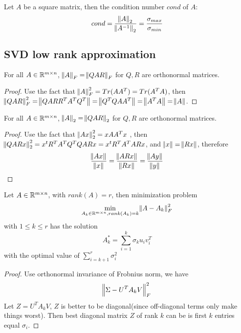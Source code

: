 \begin{refsection}
\begin{lemma}
Let $A$ be a square matrix, then the condition number $cond$ of $A$:
$$cond = \frac{\norm{A}_2}{\norm{A^{-1}}_2} = \frac{\sigma_{max}}{\sigma_{min}}$$
\end{lemma}



\subsection{SVD low rank approximation}
\begin{lemma}
For all $A\in \mathbb{R}^{m\times n}$, $\norm{A}_F = \norm{QAR}_F$ for $Q,R$ are orthonormal matrices. 
\end{lemma}

\begin{proof}
Use the fact that $\norm{A}_F^2 = Tr(AA^T) = Tr(A^TA)$, then $\norm{QAR}_F^2 = \norm{QARR^TA^TQ^T} = \norm{Q^TQAA^T} = \norm{A^TA} = \norm{A}$.
\end{proof}


\begin{lemma}
For all $A\in \mathbb{R}^{m\times n}$, $\norm{A}_2 = \norm{QAR}_2$ for $Q,R$ are orthonormal matrices. 
\end{lemma}
\begin{proof}
Use the fact that $\norm{Ax}_2^2 = xAA^Tx$ , then $\norm{QARx}_2^2 = x^tR^TA^TQ^TQARx = x^tR^TA^TARx $, and $\norm{x} = \norm{Rx}$, therefore
$$\frac{\norm{Ax}}{\norm{x}} = \frac{\norm{ARx}}{\norm{Rx}} = \frac{\norm{Ay}}{\norm{y}}$$
\end{proof}



\begin{theorem}\label{ch:linearalgebra:th:SVDFrobeniusnormlowrankapproximation}
\cite[153]{calafiore2014optimization}Let $A \in \mathbb{R}^{m\times n}$, with $rank(A)=r$, then minimization problem
$$\min_{A_k \in \mathbb{R}^{m\times n},rank(A_k)=k} \norm{A-A_k}^2_F$$
with $1\leq k\leq r$ has the solution
$$A_k^* = \sum_{i=1}^k \sigma_k u_i v_i^T$$
with the optimal value of $\sum_{i=k+1}^r \sigma^2_i$
\end{theorem}

\begin{proof}
Use orthonormal invariance of Frobnius norm, we have $$\norm{\Sigma - U^TA_kV}_F^2$$
Let $Z = U^TA_kV$, $Z$ is better to be diagonal(since off-diagonal terms only make things worst). Then best diagonal matrix $Z$ of rank $k$ can be is first $k$ entries equal $\sigma_i$.
\end{proof}



\end{refsection}
